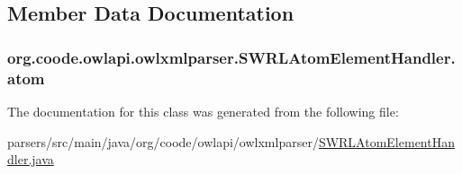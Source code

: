 \subsection{Member Data Documentation}
\hypertarget{classorg_1_1coode_1_1owlapi_1_1owlxmlparser_1_1_s_w_r_l_atom_element_handler_aaf93c2a838968a7f108fd503e6c68af7}{
\subsubsection[{atom}]{ org.\-coode.\-owlapi.\-owlxmlparser.\-S\-W\-R\-L\-Atom\-Element\-Handler.\-atom\hspace{0.3cm}{\ttfamily [private]}}}\label{classorg_1_1coode_1_1owlapi_1_1owlxmlparser_1_1_s_w_r_l_atom_element_handler_aaf93c2a838968a7f108fd503e6c68af7}


The documentation for this class was generated from the following file\-:\begin{DoxyCompactItemize}
\item 
parsers/src/main/java/org/coode/owlapi/owlxmlparser/\hyperlink{_s_w_r_l_atom_element_handler_8java}{S\-W\-R\-L\-Atom\-Element\-Handler.\-java}\end{DoxyCompactItemize}
